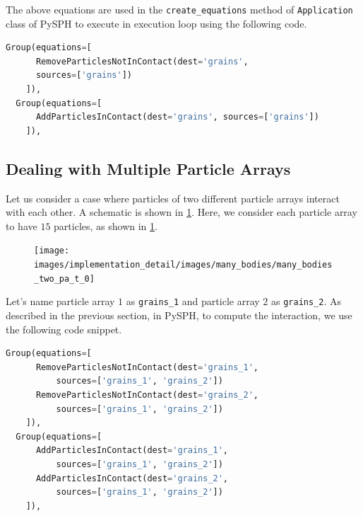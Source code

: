 The above equations are used in the \texttt{create\_equations} method of \texttt{Application}
class of PySPH to execute in execution loop using the following code.
 \lstset{basicstyle=\footnotesize\ttfamily}
\begin{lstlisting}[label={contact:equations},frame=lines,language=Python,upquote=True]
  Group(equations=[
      RemoveParticlesNotInContact(dest='grains',
      sources=['grains'])
    ]),
  Group(equations=[
      AddParticlesInContact(dest='grains', sources=['grains'])
    ]),
\end{lstlisting}


\FloatBarrier%
\subsection{Dealing with Multiple Particle Arrays}
Let us consider a case where particles of two different particle arrays
interact with each other. A schematic is shown in \cref{fig:mb:2_pa}. Here,
we consider each particle array to have $15$ particles, as shown in
\cref{fig:mb:2_pa}.
\begin{figure}[!htpb]
  \centering
  \texttt{[image: images/implementation\_detail/images/many\_bodies/many\_bodies\_two\_pa\_t\_0]}
  \caption{}
\label{fig:mb:2_pa}
\end{figure}
Let's name particle array $1$ as \texttt{grains\_1} and particle array $2$ as
\texttt{grains\_2}. As described in the previous section, in PySPH, to compute
the interaction, we use the following code snippet.
\lstset{basicstyle=\footnotesize\ttfamily}
\begin{lstlisting}[label={contact:equations},frame=lines,language=Python,upquote=True]
  Group(equations=[
      RemoveParticlesNotInContact(dest='grains_1',
          sources=['grains_1', 'grains_2'])
      RemoveParticlesNotInContact(dest='grains_2',
          sources=['grains_1', 'grains_2'])
    ]),
  Group(equations=[
      AddParticlesInContact(dest='grains_1',
          sources=['grains_1', 'grains_2'])
      AddParticlesInContact(dest='grains_2',
          sources=['grains_1', 'grains_2'])
    ]),
\end{lstlisting}


